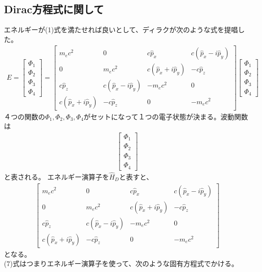 \documentclass[10pt]{jreport}
\begin{document}
\subsection*{Dirac方程式に関して}
エネルギーが(1)式を満たせれば良いとして、ディラクが次のような式を提唱した。
\begin{eqnarray}
E= \left [
\begin{array}{r}
\Phi_1 \\
\Phi_2 \\
\Phi_3 \\
\Phi_4 
\end{array}
\right ] = \left [
\begin{array}{cccc}
m_e c^2 & 0 & c\hat{p}_x & c(\hat{p}_x-i\hat{p}_y) \\
0& m_ec^2 & c(\hat{p}_x+i\hat{p}_y) & -c\hat{p}_z \\
c\hat{p}_z & c(\hat{p}_x-i\hat{p}_y) & -m_ec^2 & 0 \\
c(\hat{p}_x+i\hat{p}_y) & -c\hat{p}_z & 0 & -m_ec^2 
\end{array}
\right ] \left [
\begin{array}{r}
\Phi_1 \\
\Phi_2 \\
\Phi_3 \\
\Phi_4 
\end{array}
\right ]
\end{eqnarray}
４つの関数の$\Phi_1,\Phi_2,\Phi_3,\Phi_4$がセットになって１つの電子状態が決まる。波動関数は
\begin{eqnarray}
 \left [
\begin{array}{r}
\Phi_1 \\
\Phi_2 \\
\Phi_3 \\
\Phi_4 
\end{array}
\right ] 
\end{eqnarray}
と表される。
エネルギー演算子を$\hat{H}_D$と表すと、
\begin{eqnarray}
 \left [
\begin{array}{cccc}
m_e c^2 & 0 & c\hat{p}_x & c(\hat{p}_x-i\hat{p}_y) \\
0& m_ec^2 & c(\hat{p}_x+i\hat{p}_y) & -c\hat{p}_z \\
c\hat{p}_z & c(\hat{p}_x-i\hat{p}_y) & -m_ec^2 & 0 \\
c(\hat{p}_x+i\hat{p}_y) & -c\hat{p}_z & 0 & -m_ec^2 
\end{array}
\right ]
\end{eqnarray}
となる。\\
(7)式はつまりエネルギー演算子を使って、次のような固有方程式でかける。
\end{document}
